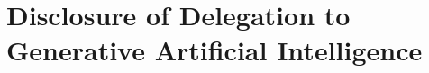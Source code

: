 \chapter{Disclosure of Delegation to Generative Artificial Intelligence}

\usepackage{aidisclose}



